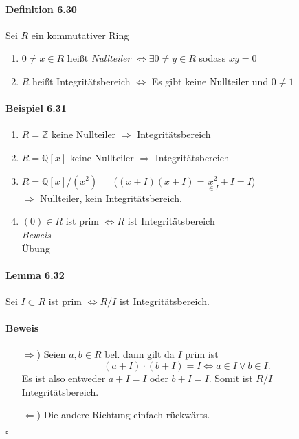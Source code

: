 \documentclass{scrartcl}
\begin{document}
\paragraph{Definition 6.30}
Sei $R$ ein kommutativer Ring
\begin{enumerate}
\item $0 \neq x \in R$ heißt \textit{Nullteiler}
  $\Leftrightarrow \exists 0 \neq y \in R$ sodass $xy = 0$
\item $R$ heißt Integritätsbereich $\Leftrightarrow$
  Es gibt keine Nullteiler und $0 \neq 1$
\end{enumerate}

\paragraph{Beispiel 6.31}
\begin{enumerate}
\item $R = \mathbb{Z}$ keine Nullteiler  $\Rightarrow$ Integritätsbereich
\item $R = \mathbb{Q}[x]$ keine Nullteiler $\Rightarrow$ Integritätsbereich
\item $R = \mathbb{Q}[x]/\left(x^2\right)$ ~~
  ($(x + I)(x + I) = \underset{\in I}{x^2} + I = I$) \\
  $\Rightarrow$ Nullteiler, kein Integritätsbereich.
\item $(0) \in R$ ist prim $\Leftrightarrow R$ ist Integritätsbereich \\
  \textit{Beweis} \\
  Übung
\end{enumerate}

\paragraph{Lemma 6.32}
Sei $I \subset R$ ist prim $\Leftrightarrow R/I$ ist Integritätsbereich.
\paragraph{Beweis}
\begin{enumerate}{}
\item[$\Rightarrow$)] Seien $a,b \in R$ bel. dann gilt da $I$ prim ist
  \[
    (a + I) \cdot (b + I) = I \iff a \in I \vee b \in I.
  \]
  Es ist also entweder $a+I=I$ oder $b+I=I$. Somit ist $R/I$ Integritätsbereich.

\item[$\Leftarrow$)] Die andere Richtung einfach rückwärts.
\end{enumerate}
\hfill $\square$
\end{document}
